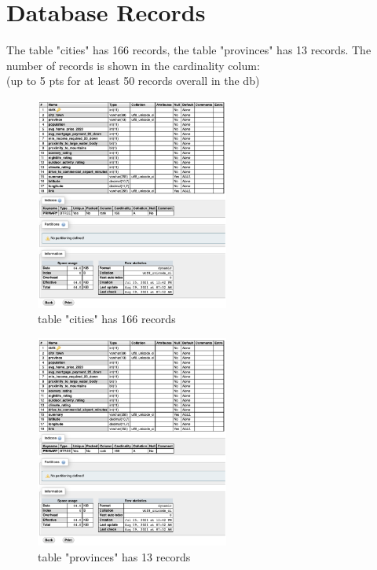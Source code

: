 \documentclass[12pt, letterpaper]{article}
\begin{document}
 \newpage

\section{Database Records}
The table "cities" has 166 records, the table "provinces" has 13 records. 
The number of records is shown in the cardinality colum:
\\(up to 5 pts for at least 50 records overall in the db)

\begin{figure}[htbp]
	\centering
	\includegraphics[width=2.5in]{images/q20-1.png}
	\caption{table "cities" has 166 records}
 \end{figure}


\begin{figure}[htbp]
	\centering
	\includegraphics[width=2.5in]{images/q20-2.png}
	\caption{table "provinces" has 13 records}
 \end{figure}
 \newpage

\end{document}
